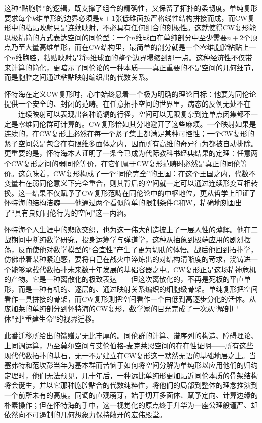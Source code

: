 \documentclass[12pt,a4paper]{article}
\begin{document}
这种“贴胞腔”的逻辑，既支撑了组合的精确性，又保留了拓扑的柔韧度。单纯复形要求每个$k$维单形的边界必须是$k+1$张低维面按严格线性结构拼接而成，而CW复形中的粘贴映射只是连续映射，不必具有任何组合的刻板性。这就使得CW复形能以极精简的方式表达空间的同伦型：一个$n$维球面在单纯剖分中至少需要$n+2$个顶点乃至大量高维单形，而在CW结构里，最简单的剖分就是一个零维胞腔粘贴上一个$n$维胞腔，粘贴映射是将$n$维球面的整个边界塌缩到那一点。这种经济性不仅带来计算的简化，更暗示了同伦论的一种本质——真正重要的不是空间的几何细节，而是胞腔之间通过粘贴映射编织出的代数关系。

怀特海在定义CW复形时，心中始终悬着一个极为明确的理论目标：他要为同伦论提供一个安全的、封闭的范畴。在任意拓扑空间的世界里，病态的反例无处不在——连续映射可以表现出各种诡谲的行径，空间可以无限复杂到连单点闭集都不一定是零维同伦群可计算的。CW复形恰如其分地避开了这些麻烦。一个映射如果是连续的，在CW复形上必然在每一个紧子集上都满足某种可控性；一个CW复形的紧子空间总是包含在有限维多面体之内，因而所有高维的奇异行为都被自动排除。更重要的是，怀特海本人证明了一条今已成为代际教科书经典结果的定理：任意两个CW复形之间的弱同伦等价，在它们属于CW复形范畴时必然是真正的同伦等价。这意味着，CW复形构成了一个“同伦完全”的王国：在这个王国之内，代数不变量若在弱同伦意义下完全重合，则其背后的空间就一定可以通过连续形变互相转换。这一结果不仅赋予了CW复形范畴在同伦论中的中枢地位，更从哲学上印证了怀特海的结构洁癖——他通过两个看似简单的限制条件C和W，精确地刻画出了“具有良好同伦行为的空间”这一内涵。

怀特海个人生涯中的悲欣交织，也为这一伟大创造披上了一层人性的薄辉。他在二战期间中断纯数学研究，投身运筹学与弹道学，这种从抽象到极端应用的剧烈摆荡，反而使他对数学模型的“合宜性”产生了更为切肤的体悟。战后他回到拓扑学，仿佛带着某种紧迫感，要将自己在战火中淬炼出的对结构清晰度的苛求，浇铸进一个能够承载代数拓扑未来数十年发展的基础容器之中。CW复形正是这场精神危机的产物。它是一种离散化的极致表达——但这次离散化的，不再是死板的平直单形，而是一种有机的、逐层的、通过映射关系编织的细胞级骨架。单纯复形把空间看作一具拼接的骨架，而CW复形则把空间看作一个由低到高逐步分化的活体。从庞加莱的单纯剖分到怀特海的CW复形，数学家的目光完成了一次从“解剖尸体”到“重建生命”的视界迁移。

此番迁移所给出的馈赠是无比丰厚的。同伦群的计算、谱序列的构造、障碍理论、上同调运算，乃至莫尔空间与艾伦伯格-麦克莱恩空间的存在性证明——所有这些现代代数拓扑的基石，无一不是建立在CW复形这一默然无语的基础地层之上。当塞弗特和范坎彭当年为基本群而苦恼于如何将空间分解为单纯形以应用他们的归约定理时，他们无法预见，几十年后，一种远比单纯形更加贴近同伦本质的骨架结构将会诞生，并以它那种胞腔贴合的代数纯粹性，将他们的局部到整体的理念推演到一个前所未有的高度。同调的直观萌芽，始于切开多面体、赋予定向、计算边缘的朴素操作；但在怀特海的手中，这一视觉化的原点终于升华为一座公理般谨严、却依然向不可遏制的几何想象力保持敞开的宏伟殿堂。
\end{document}
